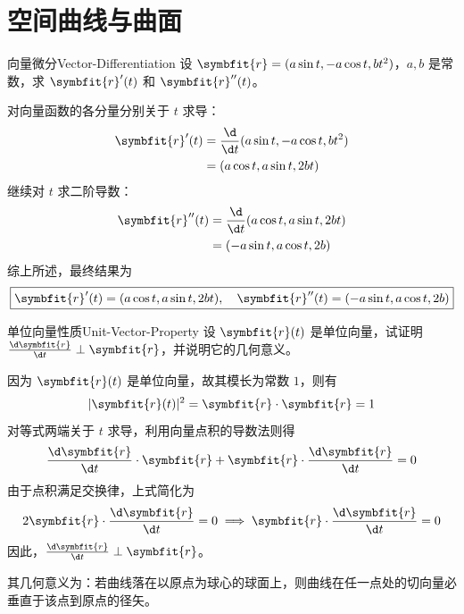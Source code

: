 \section{空间曲线与曲面}

\begin{problem}{向量微分}{Vector-Differentiation}
    设 $\symbfit{r} = (a \sin t, -a \cos t, b t^2)$，$a, b$ 是常数，求 $\symbfit{r}'(t)$ 和 $\symbfit{r}''(t)$。
\end{problem}

\begin{solution}
    对向量函数的各分量分别关于 $t$ 求导：
    \begin{equation}
        \begin{aligned}
            \symbfit{r}'(t) & = \frac{\d}{\d t} (a \sin t, -a \cos t, b t^2) \\
                            & = (a \cos t, a \sin t, 2bt)
        \end{aligned}
    \end{equation}
    继续对 $t$ 求二阶导数：
    \begin{equation}
        \begin{aligned}
            \symbfit{r}''(t) & = \frac{\d}{\d t} (a \cos t, a \sin t, 2bt) \\
                             & = (-a \sin t, a \cos t, 2b)
        \end{aligned}
    \end{equation}
    综上所述，最终结果为
    \begin{equation}
        \boxed{\symbfit{r}'(t) = (a \cos t, a \sin t, 2bt), \quad \symbfit{r}''(t) = (-a \sin t, a \cos t, 2b)}
    \end{equation}
\end{solution}


\begin{problem}{单位向量性质}{Unit-Vector-Property}
    设 $\symbfit{r}(t)$ 是单位向量，试证明 $\frac{\d \symbfit{r}}{\d t} \perp \symbfit{r}$，并说明它的几何意义。
\end{problem}

\begin{myproof}
    因为 $\symbfit{r}(t)$ 是单位向量，故其模长为常数 $1$，则有
    \begin{equation}
        |\symbfit{r}(t)|^2 = \symbfit{r} \cdot \symbfit{r} = 1
    \end{equation}
    对等式两端关于 $t$ 求导，利用向量点积的导数法则得
    \begin{equation}
        \frac{\d \symbfit{r}}{\d t} \cdot \symbfit{r} + \symbfit{r} \cdot \frac{\d \symbfit{r}}{\d t} = 0
    \end{equation}
    由于点积满足交换律，上式简化为
    \begin{equation}
        2 \symbfit{r} \cdot \frac{\d \symbfit{r}}{\d t} = 0 \implies \symbfit{r} \cdot \frac{\d \symbfit{r}}{\d t} = 0
    \end{equation}
    因此，$\frac{\d \symbfit{r}}{\d t} \perp \symbfit{r}$。

    其几何意义为：若曲线落在以原点为球心的球面上，则曲线在任一点处的切向量必垂直于该点到原点的径矢。
\end{myproof}


